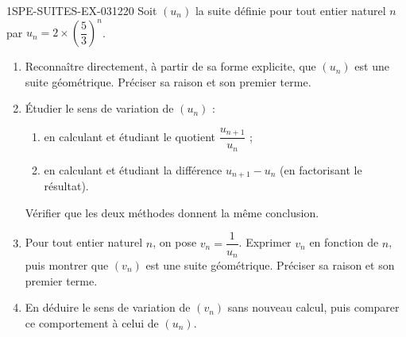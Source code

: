 \begin{exercice}{1SPE-SUITES-EX-031}{2}{20}
Soit $(u_n)$ la suite définie pour tout entier naturel $n$ par $u_n = 2 \times \left(\dfrac{5}{3}\right)^n$.

\begin{enumerate}
  \item Reconnaître directement, à partir de sa forme explicite, que $(u_n)$ est une suite géométrique. Préciser sa raison et son premier terme.

  \item Étudier le sens de variation de $(u_n)$ :
  \begin{enumerate}
    \item en calculant et étudiant le quotient $\dfrac{u_{n+1}}{u_n}$ ;
    \item en calculant et étudiant la différence $u_{n+1} - u_n$ (en factorisant le résultat).
  \end{enumerate}
  Vérifier que les deux méthodes donnent la même conclusion.

  \item Pour tout entier naturel $n$, on pose $v_n = \dfrac{1}{u_n}$. Exprimer $v_n$ en fonction de $n$, puis montrer que $(v_n)$ est une suite géométrique. Préciser sa raison et son premier terme.

  \item En déduire le sens de variation de $(v_n)$ sans nouveau calcul, puis comparer ce comportement à celui de $(u_n)$.
\end{enumerate}
\end{exercice}
